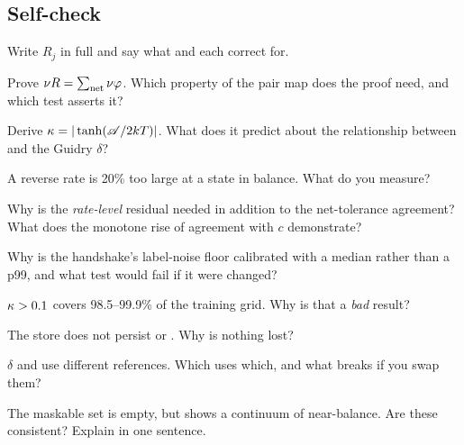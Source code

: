 \subsection{Self-check}
\label{sec:selfcheck-s8}

\begin{selfcheck}
\item Write $R_j$ in full and say what  and 
  each correct for.
\item Prove $\nu R = \sum_{\rm net} \nu\varphi$. Which property of the pair map
  does the proof need, and which test asserts it?
\item Derive $\kappa = |\tanh(\mathscr{A}/2kT)|$. What does it predict about the
  relationship between \kap{} and the Guidry $\delta$?
\item A reverse rate is 20\% too large at a state in balance. What \kap{} do you
  measure?
\item Why is the \emph{rate-level} residual needed in addition to the
  net-tolerance agreement? What does the monotone rise of agreement with $c$
  demonstrate?
\item Why is the handshake's label-noise floor calibrated with a median rather
  than a p99, and what test would fail if it were changed?
\item $\kappa > 0.1$ covers 98.5--99.9\% of the training grid. Why is that a
  \emph{bad} result?
\item The store does not persist \netflux{} or \kap. Why is nothing lost?
\item $\delta$ and \rQSE{} use different references. Which uses which, and what
  breaks if you swap them?
\item The maskable set is empty, but \kap{} shows a continuum of near-balance.
  Are these consistent? Explain in one sentence.
\end{selfcheck}
